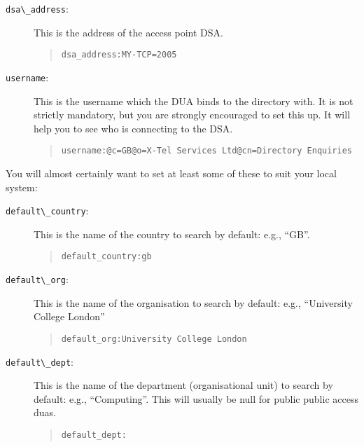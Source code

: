 \begin{description}

\item [\verb+dsa\_address+:] This is the address of the access point DSA.

\begin{quote}\small\begin{verbatim}
dsa_address:MY-TCP=2005
\end{verbatim}\end{quote}

\item [\verb+username+:] This is the username which the DUA binds to the directory
with.  It is not strictly mandatory, but you are strongly encouraged to set
this up.  It will help you to see who is connecting to the DSA.

\begin{quote}\footnotesize\begin{verbatim}
username:@c=GB@o=X-Tel Services Ltd@cn=Directory Enquiries
\end{verbatim}\end{quote}

\end{description}

You will almost certainly want to set at least some of these to suit your 
local system:

\begin{description}

\item [\verb+default\_country+:]  This is the name of the country to search by
default: e.g., ``GB''.

\begin{quote}\small\begin{verbatim}
default_country:gb
\end{verbatim}\end{quote}


\item [\verb+default\_org+:]  This is the name of the organisation to search by
default: e.g., ``University College London''

\begin{quote}\small\begin{verbatim}
default_org:University College London
\end{verbatim}\end{quote}

\item [\verb+default\_dept+:] This is the name of the department (organisational
unit) to search by default: e.g., ``Computing''.  This will usually be null
for public public access duas.

\begin{quote}\small\begin{verbatim}
default_dept:
\end{verbatim}\end{quote}

\end{description}

